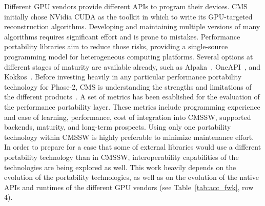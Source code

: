 \documentclass{cmspaper}
\begin{document}
Different GPU vendors provide different APIs to program their devices. CMS initially chose NVidia CUDA as the toolkit in which to write its GPU-targeted reconstruction algorithms. Developing and maintaining multiple versions of many algorithms requires significant effort and is prone to mistakes. Performance portability libraries aim to reduce those risks, providing a single-source programming model for heterogeneous computing platforms. Several options at different stages of maturity are available already, such as Alpaka~\cite{Zenker_2016}, OneAPI~\cite{oneapi, DBLP:conf/iwocl/AshbaughBBHKPSS20}, and Kokkos~\cite{CarterEdwards20143202}. 
Before investing heavily in any particular performance portability technology for Phase-2, CMS is understanding the strengths and limitations of the different products~\cite{Childers:2021tog}. A set of metrics has been esablished for the evaluation of the performance portability layer. These metrics include programming experience and ease of learning, performance, cost of integration into CMSSW, supported backends, maturity, and long-term prospects. Using only one portability technology within CMSSW is highly preferable to minimize maintenance effort. In order to prepare for a case that some of external libraries would use a different portability technology than in CMSSW, interoperability capabilities of the technologies are being explored as well. This work heavily depends on the evolution of the portability technologies, as well as on the evolution of the native APIs and runtimes of the different GPU vendors (see Table~\ref{tab:acc_fwk}, row 4).
\end{document}
